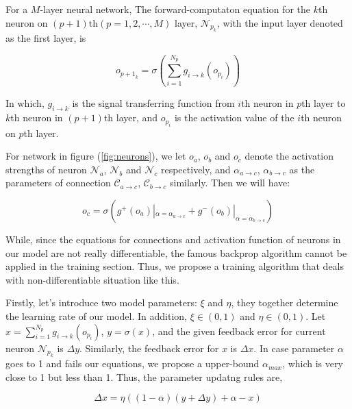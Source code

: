 \documentclass[conference]{IEEEtran}
\begin{document}
For a $M$-layer neural network, The forward-computaton equation for the
$k$th neuron on $(p+1)\text{th}(p=1,2,\cdots,M)$ layer,
$\mathcal{N}_{p_k}$, with the input layer denoted as the first layer, is

\begin{equation}
    o_{{p+1}_k}=\sigma(\sum_{i=1}^{N_p}g_{i\rightarrow{k}}(o_{p_i}))
    \label{eq:forward}
\end{equation}

In which, $g_{i\rightarrow{k}}$ is the signal transferring function from
$i$th neuron in $p$th layer to $k$th neuron
in $(p+1)$th layer,
and $o_{p_i}$ is the activation value of the $i$th neuron on
$p$th layer.

For network in figure (\ref{fig:neurons}), we let $o_a$, $o_b$ and $o_c$
denote the activation strengths of neuron $\mathcal{N}_a$, $\mathcal{N}_b$
and $\mathcal{N}_c$ respectively, and $\alpha_{a\rightarrow c}$,
$\alpha_{b\rightarrow c}$ as the parameters of connection
$\mathcal{C}_{a\rightarrow c}$, $\mathcal{C}_{b\rightarrow c}$ similarly.
Then we will have:

\begin{equation}
    o_c=\sigma(g^{+}(o_a)|_{\alpha=\alpha_{a\rightarrow c}} +
    g^{-}(o_b)|_{\alpha=\alpha_{b\rightarrow c}})
    \label{eq:forward-example}
\end{equation}

While, since the equations for connections and activation function
of neurons in our model are not really differentiable, the famous
backprop algorithm cannot be applied in the training section. Thus,
we propose a training algorithm that deals with non-differentiable
situation like this.


Firstly, let's introduce two model parameters: $\xi$ and $\eta$,
they together determine the learning rate of our model. In addition,
$\xi\in(0,1)$ and $\eta\in(0,1)$. Let
$x=\sum_{i=1}^{N_p}g_{i\rightarrow{k}}(o_{p_i})$, $y=\sigma(x)$, and the given
feedback error for current neuron $\mathcal{N}_{p_k}$ is $\Delta y$.
Similarly, the feedback error for $x$ is $\Delta x$. In case parameter $\alpha$
goes to 1 and fails our equations, we propose a upper-bound $\alpha_{max}$, which
is very close to 1 but less than 1.
Thus, the parameter updatng rules are,

\begin{equation}
    \Delta{x} = \eta\left((1-\alpha)(y+\Delta{y})+\alpha-x\right)
    \label{eq:delta-x}
\end{equation}
\end{document}

